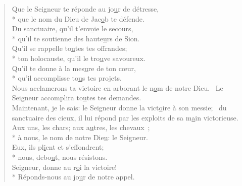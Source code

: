 
\begin{verse}
Que le Seigneur te réponde au jo\underline{u}r de détresse, \\*
que le nom du Dieu de Jac\underline{o}b te défende. \\
Du sanctuaire, qu’il t’env\underline{o}ie le secours, \\*
qu’il te soutienne des haute\underline{u}rs de Sion. \\

Qu’il se rappelle to\underline{u}tes tes offrandes; \\*
ton holocauste, qu’il le tro\underline{u}ve savoureux. \\
Qu’il te donne à la mes\underline{u}re de ton cœur, \\*
qu’il accomplisse to\underline{u}s tes projets. \\

Nous acclamerons ta victoire
en arborant le n\underline{o}m de notre Dieu.~\psalmstar
Le Seigneur accomplira
to\underline{u}tes tes demandes. \\

Maintenant, je le sais:
le Seigneur donne la vict\underline{o}ire à son messie;~\psalmstar
du sanctuaire des cieux, il lui répond
par les exploits de sa m\underline{a}in victorieuse. \\

Aux uns, les chars; aux a\underline{u}tres, les chevaux ; \\*
à nous, le nom de notre Die\underline{u}: le Seigneur. \\
Eux, ils pl\underline{i}ent et s’effondrent; \\*
nous, debo\underline{u}t, nous résistons. \\

Seigneur, donne au r\underline{o}i la victoire! \\*
Réponds-nous au jo\underline{u}r de notre appel. \\
\end{verse}

